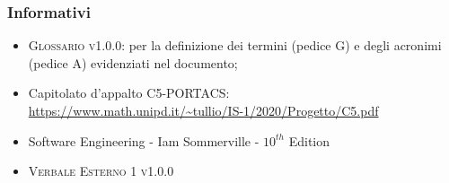 \subsubsection{Informativi}
\begin{itemize}
\item \textsc{Glossario v1.0.0}: per la definizione dei termini (pedice G) e degli acronimi (pedice A) evidenziati nel documento;
\item Capitolato d'appalto C5-PORTACS: \\
{\url{https://www.math.unipd.it/~tullio/IS-1/2020/Progetto/C5.pdf}}
\item Software Engineering - Iam Sommerville - $10^{th}$ Edition
\item \textsc{Verbale Esterno 1 v1.0.0}
 

\end{itemize}